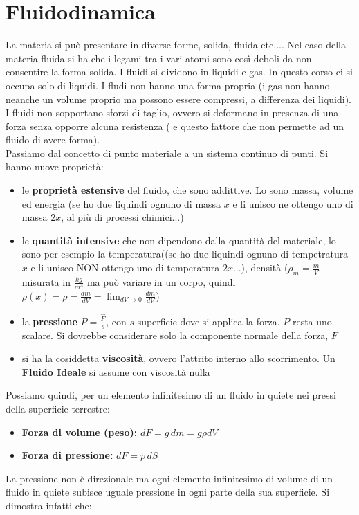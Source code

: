 \documentclass[a4paper,12pt, oneside]{book}
\begin{document}
\chapter{Fluidodinamica}
La materia si può presentare in diverse forme, solida, fluida etc.... Nel caso della materia fluida si ha che i legami tra i vari atomi sono così deboli da non consentire la forma solida. I fluidi si dividono in liquidi e gas. In questo corso ci si occupa solo di liquidi. I fludi non hanno una forma propria (i gas non hanno neanche un volume proprio ma possono essere compressi, a differenza dei liquidi). I fluidi non sopportano sforzi di taglio, ovvero si deformano in presenza di una forza senza opporre alcuna resistenza ( e questo fattore che non permette ad un fluido di avere forma). \\
Passiamo dal concetto di punto materiale a un sistema continuo di punti. Si hanno nuove proprietà:
\begin{itemize}
\item le \textbf{proprietà estensive} del fluido, che sono addittive. Lo sono massa, volume ed energia (se ho due liquindi ognuno di massa $x$ e li unisco ne ottengo uno di massa $2x$, al più di processi chimici...)
\item le \textbf{quantità intensive} che non dipendono dalla quantità del materiale, lo sono per esempio la temperatura((se ho due liquindi ognuno di tempetratura $x$ e li unisco NON ottengo uno di temperatura $2x$...), densità ($\rho_m=\frac{m}{V}$ misurata in $\frac{kg}{m^3}$ ma può variare in un corpo, quindi $\rho(x)=\rho=\frac{dm}{dV}=\lim_{dV\to 0}\frac{dm}{dV}$)
\item la \textbf{pressione} $P=\frac{\vec{F}}{s}$, con $s$ superficie dove si applica la forza. $P$ resta uno scalare. Si dovrebbe considerare solo la componente normale della forza, $F_{\perp}$
\item si ha la cosiddetta \textbf{viscosità}, ovvero l'attrito interno allo scorrimento. Un \textbf{Fluido Ideale} si assume con viscosità nulla
\end{itemize}
Possiamo quindi, per un elemento infinitesimo di un fluido in quiete nei pressi della superficie terrestre:
\begin{itemize}
\item \textbf{Forza di volume (peso):} $dF=g\,dm=g\rho dV$
\item \textbf{Forza di pressione:} $dF= p\, dS$
\end{itemize} 
La pressione non è direzionale ma ogni elemento infinitesimo di volume di un fluido in quiete subisce uguale pressione in ogni parte della sua superficie. Si dimostra infatti che:
\end{document}
